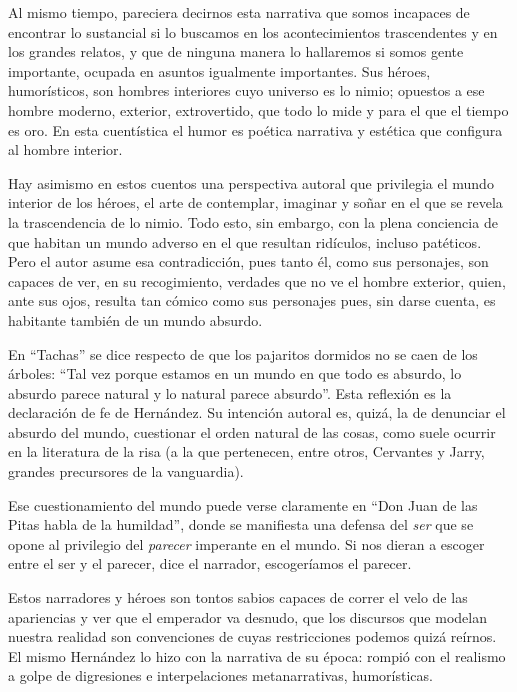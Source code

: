 \documentclass[14pt,twoside,final]{extbook} %
\begin{document}
Al mismo tiempo, pareciera decirnos esta narrativa que somos incapaces de encontrar lo sustancial si lo buscamos en los acontecimientos trascendentes y en los grandes relatos, y que de ninguna manera lo
hallaremos si somos gente importante, ocupada en asuntos igualmente importantes. Sus héroes, humorísticos, son hombres interiores cuyo universo es lo nimio; opuestos a ese hombre moderno, exterior, extrovertido, que todo lo mide y para el que el tiempo es oro. En esta cuentística el humor es poética narrativa y estética que configura al hombre interior.

Hay asimismo en estos cuentos una perspectiva autoral que privilegia el mundo interior de los héroes, el arte de contemplar, imaginar y soñar en el que se revela la trascendencia de lo nimio. Todo esto, sin embargo, con la plena conciencia de que habitan un mundo adverso en el que resultan ridículos, incluso patéticos. Pero el autor asume esa contradicción, pues tanto él, como sus personajes, son capaces de ver, en su recogimiento, verdades que no ve el hombre exterior, quien, ante sus ojos, resulta tan cómico como sus personajes pues, sin darse cuenta, es habitante también de un mundo absurdo.

En ``Tachas'' se dice respecto de que los pajaritos dormidos no se caen de los árboles: ``Tal vez porque estamos en un mundo en que todo es absurdo, lo absurdo parece natural y lo natural parece absurdo''. Esta reflexión es la declaración de fe de Hernández. Su intención autoral es, quizá, la de denunciar el absurdo del mundo, cuestionar el orden natural de las cosas, como suele ocurrir en la literatura de la risa (a la que pertenecen, entre otros, Cervantes y Jarry, grandes precursores de la vanguardia).

Ese cuestionamiento del mundo puede verse claramente en ``Don Juan de las Pitas habla de la humildad'', donde se manifiesta una defensa del \emph{ser} que se opone al privilegio del \emph{parecer} imperante en el mundo. Si nos dieran a escoger entre el ser y el parecer, dice el narrador, escogeríamos el parecer.

Estos narradores y héroes son tontos sabios capaces de correr el velo de las apariencias y ver que el emperador va desnudo, que los discursos que modelan nuestra realidad son convenciones de cuyas restricciones podemos quizá reírnos. El mismo Hernández lo hizo con la narrativa de su época: rompió con el realismo a golpe de digresiones e interpelaciones metanarrativas, humorísticas.
\end{document}
